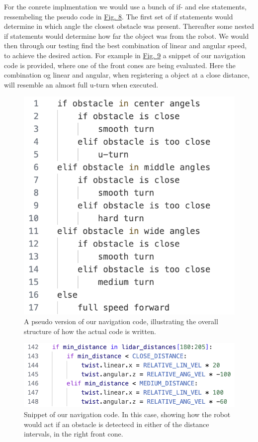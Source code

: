 \documentclass[conference]{IEEEtran}
\begin{document}
For the conrete implmentation we would use a bunch of if- and else statements, ressembeling the pseudo code in \href{sec:pseudo}{Fig. 8}.
The first set of if statements would determine in which angle the closest obstacle was present.
Thereafter some nested if statements would determine how far the object was from the robot.
We would then through our testing find the best combination of linear and angular speed, to achieve the desired action.
For example in \href{sec:navigation}{Fig. 9} a snippet of our navigation code is provided, where one of the front cones are being evaluated. 
Here the combination og linear and angular, when registering a object at a close distance, will resemble an almost full u-turn when executed.
\begin{figure}[htbp]
    \centerline{\includegraphics[width=0.75\columnwidth\hspace{-0.5cm}]{Pictures/Pseudo.png}}
    \caption{A pseudo version of our navigation code, illustrating the overall structure of how the actual code is written.}
    \label{sec:pseudo}
    \end{figure}
\begin{figure}[htbp]
    \centerline{\includegraphics[width=1.0\columnwidth\hspace{0.0cm}]{Pictures/Navigation.png}}
    \caption{Snippet of our navigation code. 
    In this case, showing how the robot would act if an obstacle is detectecd in either of the distance intervals, in the right front cone.}
    \label{sec:navigation}
    \end{figure}
\end{document}
